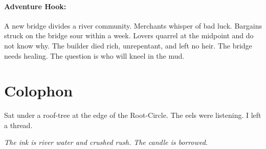 \paragraph{Adventure Hook:}

A new bridge divides a river community. Merchants whisper of bad luck. Bargains struck on the bridge sour within a week. Lovers quarrel at the midpoint and do not know why. The builder died rich, unrepentant, and left no heir. The bridge needs healing. The question is who will kneel in the mud.

\section*{Colophon}

Sat under a roof-tree at the edge of the Root-Circle. The eels were listening. I left a thread.

\noindent \textit{The ink is river water and crushed rush. The candle is borrowed.}